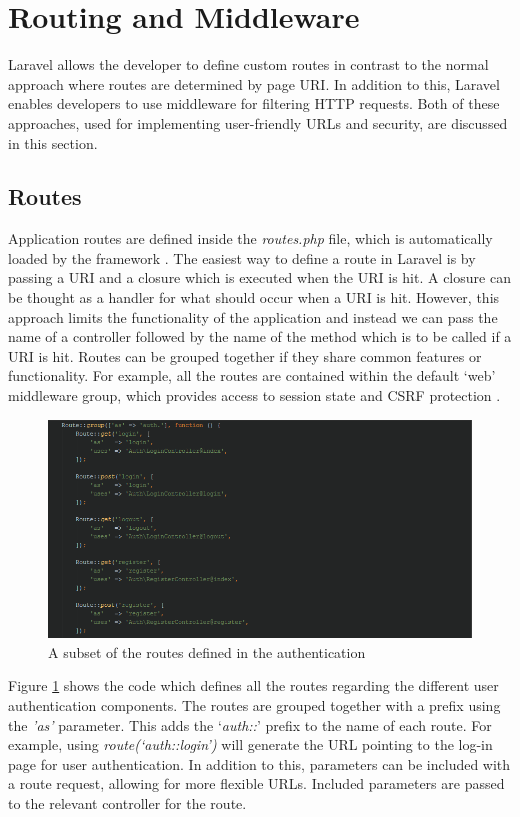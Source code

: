 \section{Routing and Middleware}
Laravel allows the developer to define custom routes in contrast to the normal approach where routes are determined by page URI. In addition to this, Laravel enables developers to use middleware for filtering HTTP requests. Both of these approaches, used for implementing user-friendly URLs and security, are discussed in this section.

\subsection{Routes}
Application routes are defined inside the \textit{routes.php} file, which is automatically loaded by the framework \cite{Laravel:Routing}. The easiest way to define a route in Laravel is by passing a URI and a closure which is executed when the URI is hit. A closure can be thought as a handler for what should occur when a URI is hit. However, this approach limits the functionality of the application and instead we can pass the name of a controller followed by the name of the method which is to be called if a URI is hit. Routes can be grouped together if they share common features or functionality. For example, all the routes are contained within the default `web' middleware group, which provides access to session state and CSRF protection \cite{Laravel:Routing}.

\begin{figure}[H]
    \centering
    \includegraphics[width=\textwidth]{Images/Implementation/LaravelRouting}
    \caption{A subset of the routes defined in the authentication} \label{fig:Routes}
\end{figure}

Figure \ref{fig:Routes} shows the code which defines all the routes regarding the different user authentication components. The routes are grouped together with a prefix using the \emph{'as'} parameter. This adds the `\emph{auth::}' prefix to the name of each route. For example, using \emph{route(`auth::login')} will generate the URL pointing to the log-in page for user authentication. In addition to this, parameters can be included with a route request, allowing for more flexible URLs. Included parameters are passed to the relevant controller for the route. 

